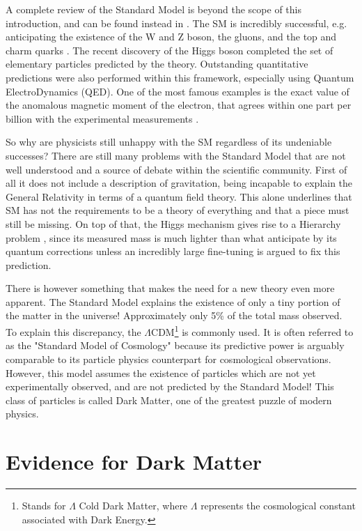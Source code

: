 A complete review of the Standard Model is beyond the scope of this introduction, and can be found instead in \cite{review-particle-physics}. The SM is incredibly successful, e.g. anticipating the existence of the W and Z boson, the gluons, and the top and charm quarks \cite{Woithe_2017}. The recent discovery of the Higgs boson \cite{Aad:2012tfa} completed the set of elementary particles predicted by the theory. Outstanding quantitative predictions were also performed within this framework, especially using Quantum ElectroDynamics (QED).  One of the most famous examples is the exact value of the anomalous magnetic moment of the electron, that agrees within one part per billion with the experimental measurements \cite{Mohr:2015ccw}.

So why are physicists still unhappy with the SM regardless of its undeniable successes? There are still many problems with the Standard Model that are not well understood and a source of debate within the scientific community. First of all it does not include a description of gravitation, being incapable to explain the General Relativity in terms of a quantum field theory. This alone underlines that SM has not the requirements to be a theory of everything and that a piece must still be missing. On top of that, the Higgs mechanism gives rise to a Hierarchy problem \cite{review-particle-physics}, since its measured mass is much lighter than what anticipate by its quantum corrections unless an incredibly large fine-tuning is argued to fix this prediction.

There is however something that makes the need for a new theory even more apparent. The Standard Model explains the existence of only a tiny portion of the matter in the universe! Approximately only 5\% of the total mass observed. To explain this discrepancy, the $\Lambda$CDM\footnote{Stands for $\Lambda$ Cold Dark Matter, where $\Lambda$ represents the cosmological constant associated with Dark Energy.} is commonly used.  It is often referred to as the "Standard Model of Cosmology" because its predictive power is arguably comparable to its particle physics counterpart for cosmological observations. However, this model assumes the existence of particles which are not yet experimentally observed, and are not predicted by the Standard Model! This class of particles is called Dark Matter, one of the greatest puzzle of modern physics.

\section{Evidence for Dark Matter}
\label{ch1:sec:dm-evidence}


